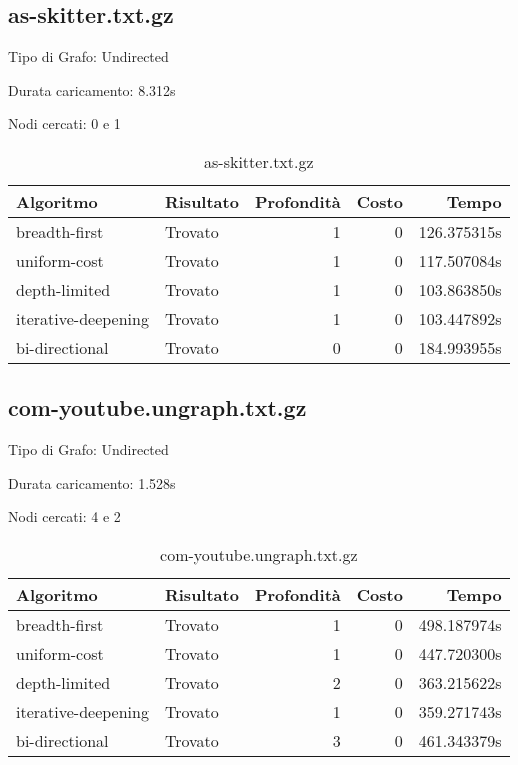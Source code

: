 \subsection{as-skitter.txt.gz}
Tipo di Grafo: Undirected

Durata caricamento: 8.312s

Nodi cercati: 0 e 1

\begin{table}[h]
	\centering
	\begin{tabular}{|l|l|r|r|r|}
		\hline
		\textbf{Algoritmo}  & \textbf{Risultato} & \textbf{Profondità} & \textbf{Costo} & \textbf{Tempo} \\
		\hline
		breadth-first       & Trovato            & 1                   & 0              & 126.375315s    \\
		uniform-cost        & Trovato            & 1                   & 0              & 117.507084s    \\
		depth-limited       & Trovato            & 1                   & 0              & 103.863850s    \\
		iterative-deepening & Trovato            & 1                   & 0              & 103.447892s    \\
		bi-directional      & Trovato            & 0                   & 0              & 184.993955s    \\
		\hline
	\end{tabular}
	\caption{as-skitter.txt.gz}
\end{table}
\subsection{com-youtube.ungraph.txt.gz}
Tipo di Grafo: Undirected

Durata caricamento: 1.528s

Nodi cercati: 4 e 2

\begin{table}[h]
	\centering
	\begin{tabular}{|l|l|r|r|r|}
		\hline
		\textbf{Algoritmo}  & \textbf{Risultato} & \textbf{Profondità} & \textbf{Costo} & \textbf{Tempo} \\
		\hline
		breadth-first       & Trovato            & 1                   & 0              & 498.187974s    \\
		uniform-cost        & Trovato            & 1                   & 0              & 447.720300s    \\
		depth-limited       & Trovato            & 2                   & 0              & 363.215622s    \\
		iterative-deepening & Trovato            & 1                   & 0              & 359.271743s    \\
		bi-directional      & Trovato            & 3                   & 0              & 461.343379s    \\
		\hline
	\end{tabular}
	\caption{com-youtube.ungraph.txt.gz}
\end{table}
\newpage
